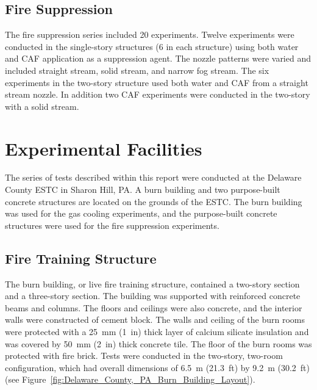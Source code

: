 \documentclass[12pt,oneside]{book}
\begin{document}
\subsection{Fire Suppression}
\label{sec:desc_Fire_Suppression}

The fire suppression series included 20 experiments. Twelve experiments were conducted in the single-story structures (6 in each structure) using both water and CAF application as a suppression agent. The nozzle patterns were varied and included straight stream, solid stream, and narrow fog stream. The six experiments in the two-story structure used both water and CAF from a straight stream nozzle.  In addition two CAF experiments were conducted in the two-story with a solid stream. 

\section{Experimental Facilities}
\label{sec:Experimental_Facility}

The series of tests described within this report were conducted at the Delaware County ESTC in Sharon Hill, PA. A burn building and two purpose-built concrete structures are located on the grounds of the ESTC. The burn building was used for the gas cooling experiments, and the purpose-built concrete structures were used for the fire suppression experiments.

\subsection{Fire Training Structure}
\label{sec:Burn_Building}

The burn building, or live fire training structure, contained a two-story section and a three-story section. The building was supported with reinforced concrete beams and columns. The floors and ceilings were also concrete, and the interior walls were constructed of cement block. The walls and ceiling of the burn rooms were protected with a 25~mm (1~in) thick layer of calcium silicate insulation and was covered by 50~mm (2~in) thick concrete tile. The floor of the burn rooms was protected with fire brick. Tests were conducted in the two-story, two-room configuration, which had overall dimensions of 6.5~m (21.3~ft) by 9.2~m (30.2~ft) (see Figure~\ref{fig:Delaware_County,_PA_Burn_Building_Layout}).
\end{document}
